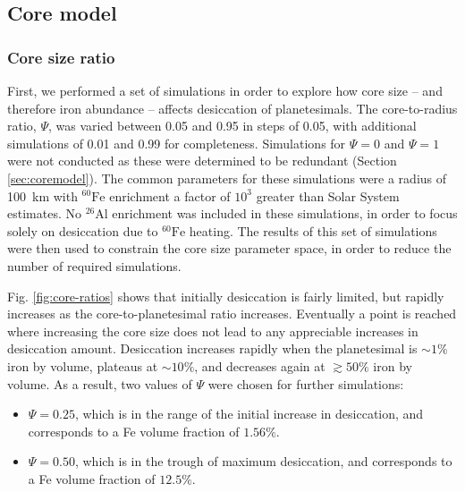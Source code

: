 \documentclass[fleqn,usenatbib]{mnras}
\newcommand{\atom}[2]{$^{#2}\text{#1}$}
\newcommand{\al}{\atom{Al}{26}}
\newcommand{\fe}{\atom{Fe}{60}}
\begin{document}
\subsection{Core model}

\subsubsection{Core size ratio}

First, we performed a set of simulations in order to explore how core size -- and therefore iron abundance -- affects desiccation of planetesimals.
The core-to-radius ratio, $\Psi$, was varied between 0.05 and 0.95 in steps of 0.05, with additional simulations of 0.01 and 0.99 for completeness.
Simulations for $\Psi = 0$ and $\Psi = 1$ were not conducted as these were determined to be redundant (Section \ref{sec:coremodel}).
The common parameters for these simulations were a radius of \SI{100}{km} with \fe{} enrichment a factor of $10^3$ greater than Solar System estimates.
No \al{} enrichment was included in these simulations, in order to focus solely on desiccation due to \fe{} heating.
The results of this set of simulations were then used to constrain the core size parameter space, in order to reduce the number of required simulations.

Fig. \ref{fig:core-ratios} shows that initially desiccation is fairly limited, but rapidly increases as the core-to-planetesimal ratio increases.
Eventually a point is reached where increasing the core size does not lead to any appreciable increases in desiccation amount.
Desiccation increases rapidly when the planetesimal is $\sim 1\%$ iron by volume, plateaus at $\sim 10\%$, and decreases again at $\gtrsim 50\%$ iron by volume.
As a result, two values of $\Psi$ were chosen for further simulations:

\begin{itemize}
  \item $\Psi = 0.25$, which is in the range of the initial increase in desiccation, and corresponds to a Fe volume fraction of $1.56\%$.
  \item $\Psi = 0.50$, which is in the trough of maximum desiccation, and corresponds to a Fe volume fraction of $12.5\%$.
\end{itemize}
\end{document}
